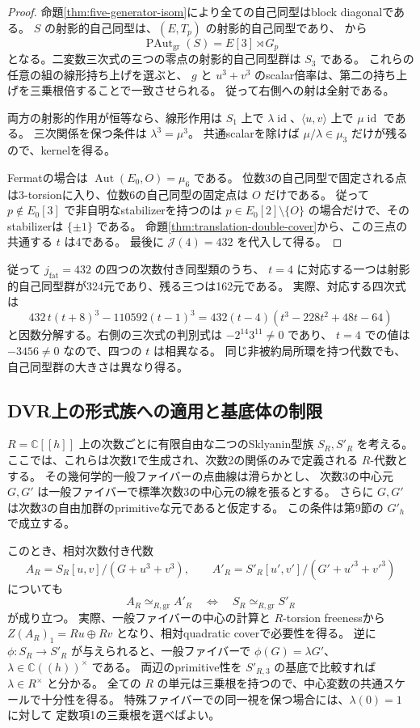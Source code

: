 \documentclass[a4paper,11pt]{ltjsarticle}
\theoremstyle{definition}
\newcommand{\CC}{\mathbb C}
\newcommand{\id}{\operatorname{id}}
\begin{document}
\begin{proof}
命題\ref{thm:five-generator-isom}により全ての自己同型はblock diagonalである。
$S$ の射影的自己同型は、$(E,T_p)$ の射影的自己同型であり、
\cite[Theorem 4.12]{IMRelations}から
\[
 \operatorname{PAut}_{\mathrm{gr}}(S)=E[3]\rtimes G_p
\]
となる。二変数三次式の三つの零点の射影的自己同型群は $S_3$ である。
これらの任意の組の線形持ち上げを選ぶと、
$g$ と $u^3+v^3$ のscalar倍率は、第二の持ち上げを三乗根倍することで一致させられる。
従って右側への射は全射である。

両方の射影的作用が恒等なら、線形作用は
$S_1$ 上で $\lambda\id$、$\langle u,v\rangle$ 上で $\mu\id$ である。
三次関係を保つ条件は $\lambda^3=\mu^3$。
共通scalarを除けば $\mu/\lambda\in\mu_3$ だけが残るので、kernelを得る。

Fermatの場合は $\operatorname{Aut}(E_0,O)=\mu_6$ である。
位数3の自己同型で固定される点は3-torsionに入り、位数6の自己同型の固定点は $O$ だけである。
従って $p\notin E_0[3]$ で非自明なstabilizerを持つのは
$p\in E_0[2]\setminus\{O\}$ の場合だけで、そのstabilizerは $\{\pm1\}$ である。
命題\ref{thm:translation-double-cover}から、この三点の共通する $t$ は4である。
最後に $\mathcal J(4)=432$ を代入して得る。
\end{proof}

従って $j_{\mathrm{fat}}=432$ の四つの次数付き同型類のうち、
$t=4$ に対応する一つは射影的自己同型群が324元であり、残る三つは162元である。
実際、対応する四次式は
\[
 432\,t(t+8)^3-110592(t-1)^3
 =432(t-4)(t^3-228t^2+48t-64)
\]
と因数分解する。右側の三次式の判別式は $-2^{14}3^{11}\ne0$ であり、
$t=4$ での値は $-3456\ne0$ なので、四つの $t$ は相異なる。
同じ非被約局所環を持つ代数でも、自己同型群の大きさは異なり得る。

\subsection{DVR上の形式族への適用と基底体の制限}

$R=\CC[[h]]$ 上の次数ごとに有限自由な二つのSklyanin型族 $S_R,S'_R$ を考える。
ここでは、これらは次数1で生成され、次数2の関係のみで定義される $R$-代数とする。
その幾何学的一般ファイバーの点曲線は滑らかとし、
次数3の中心元 $G,G'$ は一般ファイバーで標準次数3の中心元の線を張るとする。
さらに $G,G'$ は次数3の自由加群のprimitiveな元であると仮定する。
この条件は第9節の $G'_h$ で成立する。

このとき、相対次数付き代数
\[
 A_R=S_R[u,v]/(G+u^3+v^3),\qquad
 A'_R=S'_R[u',v']/(G'+u'^3+v'^3)
\]
についても
\[
 A_R\simeq_{R,\mathrm{gr}}A'_R
 \quad\Longleftrightarrow\quad
 S_R\simeq_{R,\mathrm{gr}}S'_R
\]
が成り立つ。
実際、一般ファイバーの中心の計算と $R$-torsion freenessから
$Z(A_R)_1=Ru\oplus Rv$ となり、相対quadratic coverで必要性を得る。
逆に $\phi:S_R\to S'_R$ が与えられると、一般ファイバーで
$\phi(G)=\lambda G'$、$\lambda\in\CC((h))^\times$ である。
両辺のprimitive性を $S'_{R,3}$ の基底で比較すれば
$\lambda\in R^\times$ と分かる。
全ての $R$ の単元は三乗根を持つので、中心変数の共通スケールで十分性を得る。
特殊ファイバーでの同一視を保つ場合には、$\lambda(0)=1$ に対して
定数項1の三乗根を選べばよい。
\end{document}

